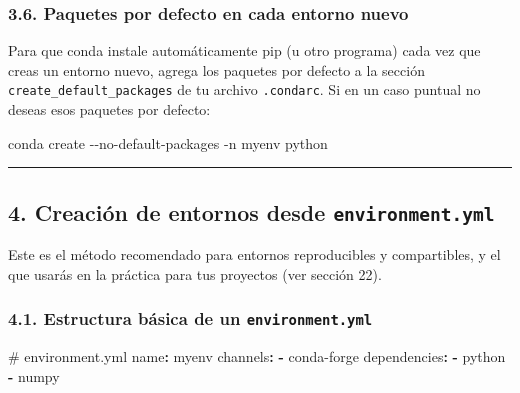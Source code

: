 \documentclass[
  doc,
  floatsintext,
  longtable,
  a4paper,
  nolmodern,
  notxfonts,
  notimes,
  12pt,
  colorlinks=true,linkcolor=blue,citecolor=blue,urlcolor=blue]{apa7}
\newenvironment{Shaded}{\begin{snugshade}}{\end{snugshade}}
\newcommand{\AttributeTok}[1]{\textcolor[rgb]{0.40,0.45,0.13}{#1}}
\newcommand{\CommentTok}[1]{\textcolor[rgb]{0.37,0.37,0.37}{#1}}
\newcommand{\ExtensionTok}[1]{\textcolor[rgb]{0.00,0.23,0.31}{#1}}
\newcommand{\FunctionTok}[1]{\textcolor[rgb]{0.28,0.35,0.67}{#1}}
\newcommand{\KeywordTok}[1]{\textcolor[rgb]{0.00,0.23,0.31}{\textbf{#1}}}
\newcommand{\NormalTok}[1]{\textcolor[rgb]{0.00,0.23,0.31}{#1}}
\begin{document}
\subsubsection{3.6. Paquetes por defecto en cada entorno
nuevo}\label{paquetes-por-defecto-en-cada-entorno-nuevo}

Para que conda instale automáticamente pip (u otro programa) cada vez
que creas un entorno nuevo, agrega los paquetes por defecto a la sección
\texttt{create\_default\_packages} de tu archivo \texttt{.condarc}. Si
en un caso puntual no deseas esos paquetes por defecto:

\begin{Shaded}
\begin{Highlighting}[]
\ExtensionTok{conda}\NormalTok{ create }\AttributeTok{{-}{-}no{-}default{-}packages} \AttributeTok{{-}n}\NormalTok{ myenv python}
\end{Highlighting}
\end{Shaded}

\begin{center}\rule{0.5\linewidth}{0.5pt}\end{center}

\subsection{\texorpdfstring{4. Creación de entornos desde
\texttt{environment.yml}}{4. Creación de entornos desde environment.yml}}\label{creaciuxf3n-de-entornos-desde-environment.yml}

Este es el método recomendado para entornos reproducibles y
compartibles, y el que usarás en la práctica para tus proyectos (ver
sección 22).

\subsubsection{\texorpdfstring{4.1. Estructura básica de un
\texttt{environment.yml}}{4.1. Estructura básica de un environment.yml}}\label{estructura-buxe1sica-de-un-environment.yml}

\begin{Shaded}
\begin{Highlighting}[]
\CommentTok{\# environment.yml}
\FunctionTok{name}\KeywordTok{:}\AttributeTok{ myenv}
\FunctionTok{channels}\KeywordTok{:}
\AttributeTok{  }\KeywordTok{{-}}\AttributeTok{ conda{-}forge}
\FunctionTok{dependencies}\KeywordTok{:}
\AttributeTok{  }\KeywordTok{{-}}\AttributeTok{ python}
\AttributeTok{  }\KeywordTok{{-}}\AttributeTok{ numpy}
\end{Highlighting}
\end{Shaded}
\end{document}
